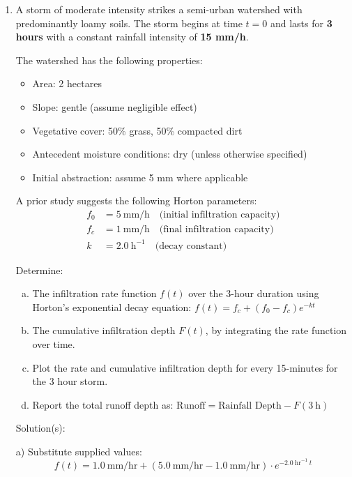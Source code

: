 \documentclass[12pt]{article}
\begin{document}
\begin{enumerate}
\clearpage
\item A storm of moderate intensity strikes a semi-urban watershed with predominantly loamy soils. The storm begins at time $ t = 0 $ and lasts for \textbf{3 hours} with a constant rainfall intensity of \textbf{15 mm/h}.

The watershed has the following properties:

\begin{itemize}
    \item Area: 2 hectares
    \item Slope: gentle (assume negligible effect)
    \item Vegetative cover: 50\% grass, 50\% compacted dirt
    \item Antecedent moisture conditions: dry (unless otherwise specified)
    \item Initial abstraction: assume 5 mm where applicable
\end{itemize}

A prior study suggests the following Horton parameters:
\begin{align*}
    f_0 &= 5\ \text{mm/h} \quad \text{(initial infiltration capacity)} \\
    f_c &= 1\ \text{mm/h} \quad \text{(final infiltration capacity)} \\
    k   &= 2.0\ \text{h}^{-1} \quad \text{(decay constant)}
\end{align*}


Determine:
\begin{enumerate}[a)]
    \item The infiltration rate function $f(t)$ over the 3-hour duration using Horton’s exponential decay equation: $f(t) = f_c + (f_0 - f_c) e^{-kt}$
    \item The cumulative infiltration depth $F(t)$, by integrating the rate function over time.
    \item Plot the rate and cumulative infiltration depth for every 15-minutes for the 3 hour storm.
    \item Report the total runoff depth as: $\text{Runoff} = \text{Rainfall Depth} - F(3\ \text{h})$
\end{enumerate}

Solution(s):

a) Substitute supplied values: 
$$f(t) = 1.0~\text{mm/hr} + (5.0~\text{mm/hr} - 1.0~\text{mm/hr}) \cdot e^{-2.0~\text{hr}^{-1}~t}$$


\end{enumerate}
\end{document}
